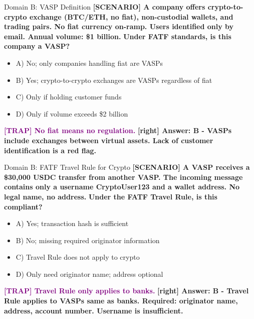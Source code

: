 \documentclass[11pt,a4paper]{beamer}
\newcommand{\trap}[1]{\textcolor{purple}{\textbf{[TRAP] #1}}}
\newcommand{\correct}[1]{\textcolor{green!50!black}{\textbf{[right] #1}}}
\newcommand{\scenario}[1]{\textcolor{blue!70!black}{\textbf{[SCENARIO] #1}}}
\begin{document}
\begin{frame}{Domain B: VASP Definition}
\scenario{A company offers crypto-to-crypto exchange (BTC/ETH, no fiat), non-custodial wallets, and trading pairs. No fiat currency on-ramp. Users identified only by email. Annual volume: \$1 billion.}
\vspace{0.2cm}
\textbf{Under FATF standards, is this company a VASP?}
\vspace{0.2cm}
\begin{itemize}
    \item A) No; only companies handling fiat are VASPs
    \item B) Yes; crypto-to-crypto exchanges are VASPs regardless of fiat
    \item C) Only if holding customer funds
    \item D) Only if volume exceeds \$2 billion
\end{itemize}
\vspace{0.2cm}
\trap{No fiat means no regulation.}
\correct{Answer: B - VASPs include exchanges between virtual assets. Lack of customer identification is a red flag.}
\end{frame}

\begin{frame}{Domain B: FATF Travel Rule for Crypto}
\scenario{A VASP receives a \$30,000 USDC transfer from another VASP. The incoming message contains only a username CryptoUser123 and a wallet address. No legal name, no address.}
\vspace{0.2cm}
\textbf{Under the FATF Travel Rule, is this compliant?}
\vspace{0.2cm}
\begin{itemize}
    \item A) Yes; transaction hash is sufficient
    \item B) No; missing required originator information
    \item C) Travel Rule does not apply to crypto
    \item D) Only need originator name; address optional
\end{itemize}
\vspace{0.2cm}
\trap{Travel Rule only applies to banks.}
\correct{Answer: B - Travel Rule applies to VASPs same as banks. Required: originator name, address, account number. Username is insufficient.}
\end{frame}
\end{document}
